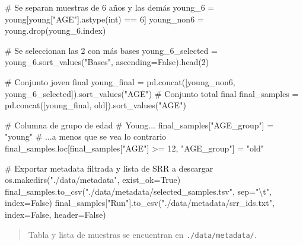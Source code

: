 \documentclass[
  12pt,
  letterpaper,
  DIV=11,
  numbers=noendperiod]{scrartcl}
\newenvironment{Shaded}{\begin{snugshade}}{\end{snugshade}}
\newcommand{\BuiltInTok}[1]{\textcolor[rgb]{0.00,0.23,0.31}{#1}}
\newcommand{\CharTok}[1]{\textcolor[rgb]{0.13,0.47,0.30}{#1}}
\newcommand{\CommentTok}[1]{\textcolor[rgb]{0.37,0.37,0.37}{#1}}
\newcommand{\DecValTok}[1]{\textcolor[rgb]{0.68,0.00,0.00}{#1}}
\newcommand{\NormalTok}[1]{\textcolor[rgb]{0.00,0.23,0.31}{#1}}
\newcommand{\OperatorTok}[1]{\textcolor[rgb]{0.37,0.37,0.37}{#1}}
\newcommand{\StringTok}[1]{\textcolor[rgb]{0.13,0.47,0.30}{#1}}
\newcommand{\VariableTok}[1]{\textcolor[rgb]{0.07,0.07,0.07}{#1}}
\begin{document}
\begin{Shaded}
\begin{Highlighting}[]
\CommentTok{\# Se separan muestras de 6 años y las demás}
\NormalTok{young\_6 }\OperatorTok{=}\NormalTok{ young[young[}\StringTok{"AGE"}\NormalTok{].astype(}\BuiltInTok{int}\NormalTok{) }\OperatorTok{==} \DecValTok{6}\NormalTok{]}
\NormalTok{young\_non6 }\OperatorTok{=}\NormalTok{ young.drop(young\_6.index)}

\CommentTok{\# Se seleccionan las 2 con más bases}
\NormalTok{young\_6\_selected }\OperatorTok{=}\NormalTok{ young\_6.sort\_values(}\StringTok{"Bases"}\NormalTok{, ascending}\OperatorTok{=}\VariableTok{False}\NormalTok{).head(}\DecValTok{2}\NormalTok{)}

\CommentTok{\# Conjunto joven final}
\NormalTok{young\_final }\OperatorTok{=}\NormalTok{ pd.concat([young\_non6, young\_6\_selected]).sort\_values(}\StringTok{"AGE"}\NormalTok{)}
\CommentTok{\# Conjunto total final}
\NormalTok{final\_samples }\OperatorTok{=}\NormalTok{ pd.concat([young\_final, old]).sort\_values(}\StringTok{"AGE"}\NormalTok{)}

\CommentTok{\# Columna de grupo de edad}
\CommentTok{\# Young...}
\NormalTok{final\_samples[}\StringTok{"AGE\_group"}\NormalTok{] }\OperatorTok{=} \StringTok{"young"}
\CommentTok{\# ...a menos que se vea lo contrario}
\NormalTok{final\_samples.loc[final\_samples[}\StringTok{"AGE"}\NormalTok{] }\OperatorTok{\textgreater{}=} \DecValTok{12}\NormalTok{, }\StringTok{"AGE\_group"}\NormalTok{] }\OperatorTok{=} \StringTok{"old"}

\CommentTok{\# Exportar metadata filtrada y lista de SRR a descargar}
\NormalTok{os.makedirs(}\StringTok{"./data/metadata"}\NormalTok{, exist\_ok}\OperatorTok{=}\VariableTok{True}\NormalTok{)}
\NormalTok{final\_samples.to\_csv(}\StringTok{"./data/metadata/selected\_samples.tsv"}\NormalTok{, sep}\OperatorTok{=}\StringTok{"}\CharTok{\textbackslash{}t}\StringTok{"}\NormalTok{, index}\OperatorTok{=}\VariableTok{False}\NormalTok{)}
\NormalTok{final\_samples[}\StringTok{"Run"}\NormalTok{].to\_csv(}\StringTok{"./data/metadata/srr\_ids.txt"}\NormalTok{, index}\OperatorTok{=}\VariableTok{False}\NormalTok{, header}\OperatorTok{=}\VariableTok{False}\NormalTok{)}
\end{Highlighting}
\end{Shaded}

\begin{quote}
Tabla y lista de muestras se encuentran en \texttt{./data/metadata/}.
\end{quote}
\end{document}

